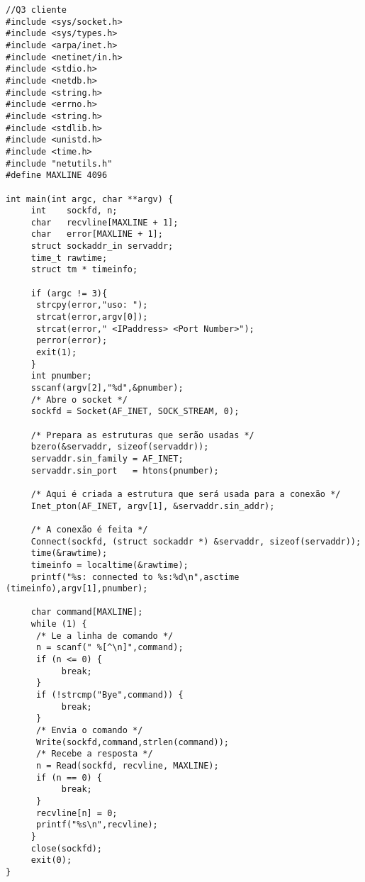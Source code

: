 \documentclass[11pt]{article}
\begin{document}
\begin{lstlisting}
//Q3 cliente
#include <sys/socket.h>
#include <sys/types.h>
#include <arpa/inet.h>
#include <netinet/in.h>
#include <stdio.h>
#include <netdb.h>
#include <string.h>
#include <errno.h>
#include <string.h>
#include <stdlib.h>
#include <unistd.h>
#include <time.h>
#include "netutils.h"
#define MAXLINE 4096

int main(int argc, char **argv) {
     int    sockfd, n;
     char   recvline[MAXLINE + 1];
     char   error[MAXLINE + 1];
     struct sockaddr_in servaddr;
     time_t rawtime;
     struct tm * timeinfo;

     if (argc != 3){
	  strcpy(error,"uso: ");
	  strcat(error,argv[0]);
	  strcat(error," <IPaddress> <Port Number>");
	  perror(error);
	  exit(1);
     }
     int pnumber;
     sscanf(argv[2],"%d",&pnumber);
     /* Abre o socket */
     sockfd = Socket(AF_INET, SOCK_STREAM, 0);

     /* Prepara as estruturas que serão usadas */
     bzero(&servaddr, sizeof(servaddr));
     servaddr.sin_family = AF_INET;
     servaddr.sin_port   = htons(pnumber);

     /* Aqui é criada a estrutura que será usada para a conexão */
     Inet_pton(AF_INET, argv[1], &servaddr.sin_addr);

     /* A conexão é feita */
     Connect(sockfd, (struct sockaddr *) &servaddr, sizeof(servaddr));
     time(&rawtime);
     timeinfo = localtime(&rawtime);
     printf("%s: connected to %s:%d\n",asctime (timeinfo),argv[1],pnumber);

     char command[MAXLINE];
     while (1) {
	  /* Le a linha de comando */
	  n = scanf(" %[^\n]",command);
	  if (n <= 0) {
	       break;
	  }
	  if (!strcmp("Bye",command)) {
	       break;
	  }
	  /* Envia o comando */
	  Write(sockfd,command,strlen(command));
	  /* Recebe a resposta */
	  n = Read(sockfd, recvline, MAXLINE);
	  if (n == 0) {
	       break;
	  }
	  recvline[n] = 0;
	  printf("%s\n",recvline);
     }
     close(sockfd);
     exit(0);
}

\end{lstlisting}
\end{document}
